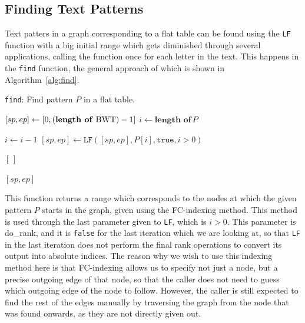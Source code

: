 \documentclass[a4paper,12pt,twoside,BCOR=10mm]{scrbook}
\begin{document}
\subsection{Finding Text Patterns}

Text patters in a graph corresponding to a flat table
can be found using the \texttt{LF} function with a big initial range which gets diminished through
several applications, calling the function once for each letter in the text.
This happens in the \texttt{find} function, the general approach of which is shown in Algorithm~\ref{alg:find}.
\begin{algorithm}
\caption[\texttt{find}: Find pattern in a flat table]{\texttt{find}: Find pattern $ P $ in a flat table.}
\label{alg:find}
\begin{algorithmic}[1]

\State $ [ sp, ep ] \gets [ 0, ( \textrm{\textbf{length of} BWT} ) - 1 ] $
\State $ i \gets \textbf{length of} \, P $

\State \phantom{nl}

	\State $ i \gets i - 1 $
	\State $ [ sp, ep ] \gets \texttt{LF} ( [ sp, ep ] , P [ i ] , \texttt{true} , i > 0 ) $

	\State \phantom{nl}

		\State \Return $ [ \, ] $
	\EndIf
\EndWhile

\State \phantom{nl}

\State \Return $ [ sp, ep ] $

\end{algorithmic}
\end{algorithm}
This function returns a range which corresponds to the nodes
at which the given pattern $ P $ starts in the graph,
given using the FC-indexing method.
This method is used through the last parameter given to \texttt{LF}, which is $ i > 0 $.
This parameter is do\_rank, and it is \texttt{false} for the last iteration which we
are looking at, so that \texttt{LF} in the last iteration does not perform the final rank operations
to convert its output into absolute indices.
The reason why we wish to use this indexing method here
is that FC-indexing allows us to specify not just a node,
but a precise outgoing edge of that node, so that the caller does
not need to guess which outgoing edge of the node to follow.
However, the caller is still expected to find the rest of the edges manually by
traversing the graph from the node that was found onwards,
as they are not directly given out.
\end{document}
